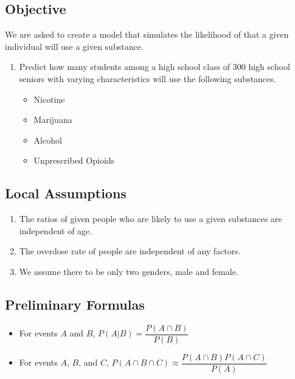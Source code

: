 \documentclass{article}
\begin{document}
    \subsection{Objective}
    We are asked to create a model that simulates the likelihood of that a given individual will use a given substance. 
    \begin{enumerate}
        \item Predict how many students among a high school class of 300 high school seniors with varying characteristics will use the following substances.
        \begin{itemize}
            \item Nicotine
            \item Marijuana
            \item Alcohol
            \item Unprescribed Opioids
        \end{itemize}
    \end{enumerate}
    \subsection{Local Assumptions}
    \begin{enumerate}
        \item The ratios of given people who are likely to use a given substances are independent of age.
        \item The overdose rate of people are independent of any factors.
        \item{We assume there to be only two genders, male and female.}
    \end{enumerate}
    \subsection{Preliminary Formulas}
    \begin{itemize}
     \item For events $A$ and $B$, $\displaystyle P(A|B)=\dfrac{P(A\cap B)}{P(B)}$
     \\
     \item For events $A$, $B$, and $C$, $P(A\cap B\cap C) \approx \dfrac{P(A \cap B)P(A\cap C)}{P(A)}$
     \end{itemize}
\end{document}
